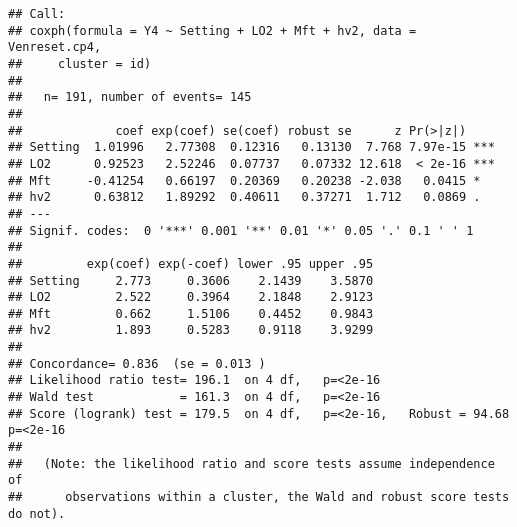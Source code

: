 \documentclass[
]{article}
\newenvironment{Shaded}{\begin{snugshade}}{\end{snugshade}}
\newcommand{\AttributeTok}[1]{\textcolor[rgb]{0.77,0.63,0.00}{#1}}
\newcommand{\DecValTok}[1]{\textcolor[rgb]{0.00,0.00,0.81}{#1}}
\newcommand{\FunctionTok}[1]{\textcolor[rgb]{0.00,0.00,0.00}{#1}}
\newcommand{\NormalTok}[1]{#1}
\newcommand{\OtherTok}[1]{\textcolor[rgb]{0.56,0.35,0.01}{#1}}
\newcommand{\SpecialCharTok}[1]{\textcolor[rgb]{0.00,0.00,0.00}{#1}}
\newcommand{\StringTok}[1]{\textcolor[rgb]{0.31,0.60,0.02}{#1}}
\begin{document}
\begin{Shaded}
\end{Shaded}

\begin{verbatim}
## Call:
## coxph(formula = Y4 ~ Setting + LO2 + Mft + hv2, data = Venreset.cp4, 
##     cluster = id)
## 
##   n= 191, number of events= 145 
## 
##             coef exp(coef) se(coef) robust se      z Pr(>|z|)    
## Setting  1.01996   2.77308  0.12316   0.13130  7.768 7.97e-15 ***
## LO2      0.92523   2.52246  0.07737   0.07332 12.618  < 2e-16 ***
## Mft     -0.41254   0.66197  0.20369   0.20238 -2.038   0.0415 *  
## hv2      0.63812   1.89292  0.40611   0.37271  1.712   0.0869 .  
## ---
## Signif. codes:  0 '***' 0.001 '**' 0.01 '*' 0.05 '.' 0.1 ' ' 1
## 
##         exp(coef) exp(-coef) lower .95 upper .95
## Setting     2.773     0.3606    2.1439    3.5870
## LO2         2.522     0.3964    2.1848    2.9123
## Mft         0.662     1.5106    0.4452    0.9843
## hv2         1.893     0.5283    0.9118    3.9299
## 
## Concordance= 0.836  (se = 0.013 )
## Likelihood ratio test= 196.1  on 4 df,   p=<2e-16
## Wald test            = 161.3  on 4 df,   p=<2e-16
## Score (logrank) test = 179.5  on 4 df,   p=<2e-16,   Robust = 94.68  p=<2e-16
## 
##   (Note: the likelihood ratio and score tests assume independence of
##      observations within a cluster, the Wald and robust score tests do not).
\end{verbatim}
\end{document}
